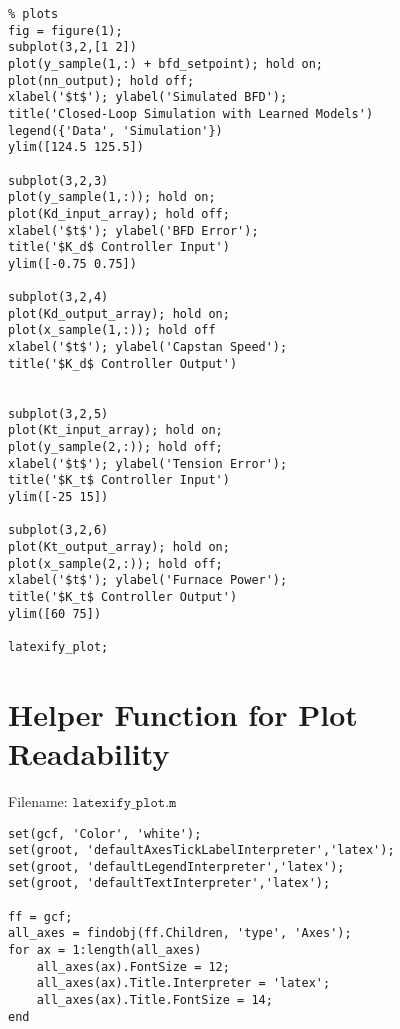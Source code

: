 \begin{lstlisting}
% plots
fig = figure(1);
subplot(3,2,[1 2])
plot(y_sample(1,:) + bfd_setpoint); hold on;
plot(nn_output); hold off;
xlabel('$t$'); ylabel('Simulated BFD'); 
title('Closed-Loop Simulation with Learned Models')
legend({'Data', 'Simulation'})
ylim([124.5 125.5])

subplot(3,2,3)
plot(y_sample(1,:)); hold on;
plot(Kd_input_array); hold off;
xlabel('$t$'); ylabel('BFD Error');
title('$K_d$ Controller Input')
ylim([-0.75 0.75])

subplot(3,2,4)
plot(Kd_output_array); hold on;
plot(x_sample(1,:)); hold off
xlabel('$t$'); ylabel('Capstan Speed');
title('$K_d$ Controller Output')


subplot(3,2,5)
plot(Kt_input_array); hold on;
plot(y_sample(2,:)); hold off;
xlabel('$t$'); ylabel('Tension Error');
title('$K_t$ Controller Input')
ylim([-25 15])

subplot(3,2,6)
plot(Kt_output_array); hold on;
plot(x_sample(2,:)); hold off;
xlabel('$t$'); ylabel('Furnace Power');
title('$K_t$ Controller Output')
ylim([60 75])

latexify_plot;
\end{lstlisting}

\section{Helper Function for Plot Readability}

Filename: $\texttt{latexify\_plot.m}$

\begin{lstlisting}
set(gcf, 'Color', 'white');
set(groot, 'defaultAxesTickLabelInterpreter','latex'); 
set(groot, 'defaultLegendInterpreter','latex');
set(groot, 'defaultTextInterpreter','latex');

ff = gcf;
all_axes = findobj(ff.Children, 'type', 'Axes');
for ax = 1:length(all_axes)
    all_axes(ax).FontSize = 12;
    all_axes(ax).Title.Interpreter = 'latex';
    all_axes(ax).Title.FontSize = 14;    
end
\end{lstlisting}

